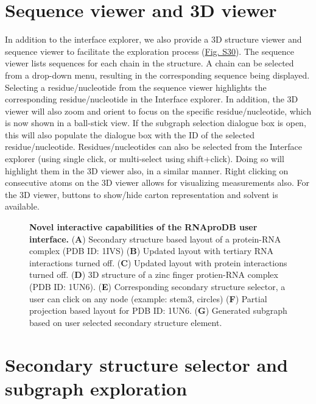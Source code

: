 \section{Sequence viewer and 3D viewer}

In addition to the interface explorer, we also provide a 3D structure viewer and sequence viewer to facilitate the exploration process (\hyperref[fig:rnaprodbS2]{Fig. S30}). The sequence viewer lists sequences for each chain in the structure. A chain can be selected from a drop-down menu, resulting in the corresponding sequence being displayed. Selecting a residue/nucleotide from the sequence viewer highlights the corresponding residue/nucleotide in the Interface explorer. In addition, the 3D viewer will also zoom and orient to focus on the specific residue/nucleotide, which is now shown in a ball-stick view. If the subgraph selection dialogue box is open, this will also populate the dialogue box with the ID of the selected residue/nucleotide. Residues/nucleotides can also be selected from the 
Interface explorer (using single click, or multi-select using shift+click). Doing so will highlight them in the 3D viewer also, in a similar manner. Right clicking on consecutive atoms on the 3D viewer allows for visualizing measurements also. For the 3D viewer, buttons to show/hide carton representation and solvent is available.
\begin{center}
    \begin{figure}
        \caption[Novel interactive capabilities of the RNAproDB user interface]{\textbf{Novel interactive capabilities of the RNAproDB user interface.} ({\bf A}) Secondary structure based layout of a protein-RNA complex (PDB ID: 1IVS) ({\bf B})  Updated layout with tertiary RNA interactions turned off. ({\bf C}) Updated layout with protein interactions turned off. ({\bf D}) 3D structure of a zinc finger protien-RNA complex (PDB ID: 1UN6). ({\bf E}) Corresponding secondary structure selector, a user can click on any node (example: stem3, circles) ({\bf F}) Partial projection based layout for PDB ID: 1UN6. ({\bf G}) Generated subgraph based on user selected secondary structure element.}
  \label{fig:rnaprodb2}
\end{figure}
\end{center}
\section{Secondary structure selector and subgraph exploration}

